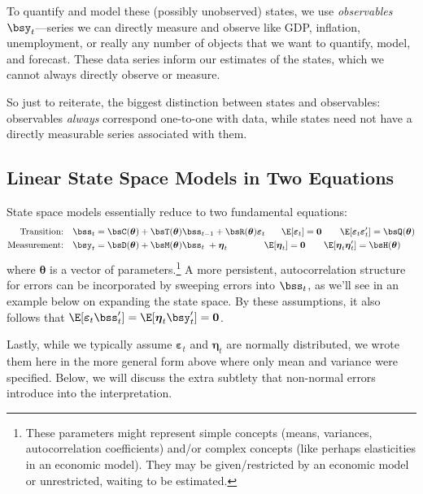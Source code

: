 \documentclass[12pt]{article}
\theoremstyle{plain}
\theoremstyle{definition}
\theoremstyle{remark}
\newcommand{\bseta}{\boldsymbol{\eta}}
\newcommand{\bstheta}{\boldsymbol{\theta}}
\newcommand{\bsvarepsilon}{\boldsymbol{\varepsilon}}
\renewcommand{\bso}{\boldsymbol{0}}
\begin{document}
To quantify and model these (possibly unobserved) states, we use
\emph{observables} $\bsy_t$---series we can directly measure and observe
like GDP, inflation, unemployment, or really any number of objects
that we want to quantify, model, and forecast. These data series inform
our estimates of the states, which we cannot always directly observe or
measure.

So just to reiterate, the biggest distinction between states and
observables: observables \emph{always} correspond one-to-one with data,
while states need not have a directly measurable series associated with
them.


\subsection{Linear State Space Models in Two Equations}

State space models essentially reduce to two fundamental equations:
\begin{align}
  \text{Transition:} \quad
    \bss_{t} &= \bsC(\bstheta) + \bsT(\bstheta) \bss_{t-1}
    + \bsR(\bstheta)\bsvarepsilon_{t} \label{ste}\
    \,\;\quad \E[\bsvarepsilon_t] = \bso
    \quad\quad \E[\bsvarepsilon_t \bsvarepsilon'_t] =  \bsQ(\bstheta) \\
  \text{Measurement:} \quad
    \bsy_{t} &= \bsD(\bstheta) + \bsM(\bstheta) \bss_{t}
    \;+ \bseta_{t} \label{moe}
    \qquad\qquad \E[\bseta_t] =  \bso
    \quad\quad \E[\bseta_t \bseta'_t] =  \bsH(\bstheta)
\end{align}
where $\bstheta$ is a vector of parameters.\footnote{%
  These parameters might represent simple concepts (means, variances,
  autocorrelation coefficients) and/or complex concepts (like perhaps
  elasticities in an economic model).
  They may be given/restricted by an economic model or unrestricted,
  waiting to be estimated.
}
A more persistent, autocorrelation structure for errors can be
incorporated by sweeping errors into $\bss_t$, as we'll see in an
example below on expanding the state space.
By these assumptions, it also follows that
$\E[\bsvarepsilon_t \bss_t']=\E[\bseta_t \bsy_t']=\bso$.

Lastly, while we typically assume $\bsvarepsilon_t$ and $\bseta_t$ are
normally distributed, we wrote them here in the more general form above
where only mean and variance were specified.
Below, we will discuss the extra subtlety that non-normal errors
introduce into the interpretation.
\end{document}
